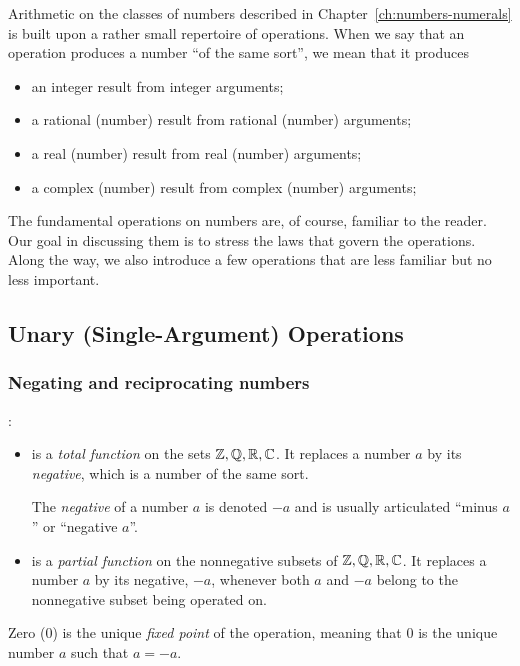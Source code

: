 \smallskip


Arithmetic on the classes of numbers described in Chapter~\ref{ch:numbers-numerals} is built upon a rather small repertoire of operations.  When we say that an operation produces a number ``of the same sort'', we mean that it produces
\begin{itemize}
\item
an integer result from integer arguments;
\item
a rational (number) result from rational (number) arguments;
\item
a real (number) result from real (number) arguments;
\item
a complex (number) result from complex (number) arguments;
\end{itemize}
The fundamental operations on numbers are, of course, familiar to the reader.  Our goal in discussing them is to stress the laws that govern the operations.  Along the way, we also introduce a few operations that are less familiar but no less important.

\subsection{Unary (Single-Argument) Operations}
\label{sec:unary-ops}

\subsubsection{Negating and reciprocating numbers}
 

:
\begin{itemize}
\item
is a {\em total function} on the sets $\mathbb{Z}, \mathbb{Q}, \mathbb{R}, \mathbb{C}$.  It replaces a number $a$ by its {\em negative}, which is a number of the same sort.

\smallskip

The {\it negative} of a number $a$ is denoted $-a$ and is usually articulated ``minus $a$'' or ``negative $a$''.
\item
is a {\em partial function} on the nonnegative subsets of $\mathbb{Z}, \mathbb{Q}, \mathbb{R}, \mathbb{C}$.  It replaces a number $a$ by its negative, $-a$, whenever both $a$ and $-a$ belong to the nonnegative subset being
operated on.
\end{itemize}
Zero ($0$) is the unique {\it fixed point} of the operation, meaning that $0$ is the unique number $a$ such that $a = -a$.

